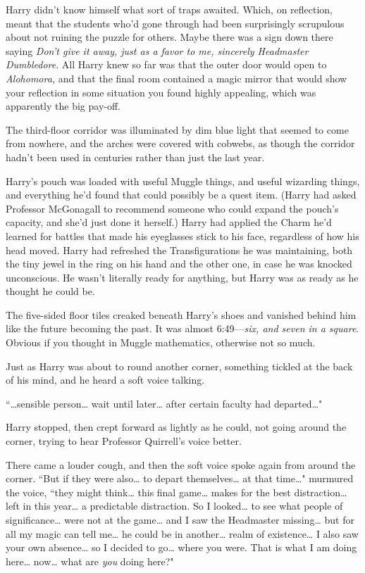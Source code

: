 Harry didn't know himself what sort of traps awaited. Which, on reflection, meant that the students who'd gone through had been surprisingly scrupulous about not ruining the puzzle for others. Maybe there was a sign down there saying \emph{Don't give it away, just as a favor to me, sincerely Headmaster Dumbledore}. All Harry knew so far was that the outer door would open to \emph{Alohomora,} and that the final room contained a magic mirror that would show your reflection in some situation you found highly appealing, which was apparently the big pay-off.

The third-floor corridor was illuminated by dim blue light that seemed to come from nowhere, and the arches were covered with cobwebs, as though the corridor hadn't been used in centuries rather than just the last year.

Harry's pouch was loaded with useful Muggle things, and useful wizarding things, and everything he'd found that could possibly be a quest item. (Harry had asked Professor McGonagall to recommend someone who could expand the pouch's capacity, and she'd just done it herself.) Harry had applied the Charm he'd learned for battles that made his eyeglasses stick to his face, regardless of how his head moved. Harry had refreshed the Transfigurations he was maintaining, both the tiny jewel in the ring on his hand and the other one, in case he was knocked unconscious. He wasn't literally ready for anything, but Harry was as ready as he thought he could be.

The five-sided floor tiles creaked beneath Harry's shoes and vanished behind him like the future becoming the past. It was almost 6:49—\emph{six, and seven in a square}. Obvious if you thought in Muggle mathematics, otherwise not so much.

Just as Harry was about to round another corner, something tickled at the back of his mind, and he heard a soft voice talking.

``{\ldots}sensible person{\ldots} wait until later{\ldots} after certain faculty had departed{\ldots}"

Harry stopped, then crept forward as lightly as he could, not going around the corner, trying to hear Professor Quirrell's voice better.

There came a louder cough, and then the soft voice spoke again from around the corner. ``But if they were also{\ldots} to depart themselves{\ldots} at that time{\ldots}" murmured the voice, ``they might think{\ldots} this final game{\ldots} makes for the best distraction{\ldots} left in this year{\ldots} a predictable distraction. So I looked{\ldots} to see what people of significance{\ldots} were not at the game{\ldots} and I saw the Headmaster missing{\ldots} but for all my magic can tell me{\ldots} he could be in another{\ldots} realm of existence{\ldots} I also saw your own absence{\ldots} so I decided to go{\ldots} where you were. That is what I am doing here{\ldots} now{\ldots} what are \emph{you} doing here?"

